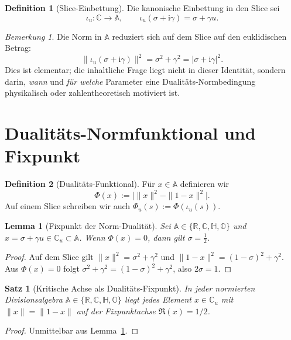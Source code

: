 \documentclass[11pt,a4paper]{article}
\theoremstyle{plain}
\newtheorem{satz}{Satz}
\newtheorem{lemma}{Lemma}
\theoremstyle{definition}
\newtheorem{definition}{Definition}
\theoremstyle{remark}
\newtheorem{bemerkung}{Bemerkung}
\newcommand{\C}{\mathbb{C}}
\newcommand{\R}{\mathbb{R}}
\newcommand{\Hh}{\mathbb{H}}
\newcommand{\Okt}{\mathbb{O}}
\newcommand{\ii}{\mathrm{i}}
\begin{document}
\begin{definition}[Slice-Einbettung]
Die kanonische Einbettung in den Slice sei
\[
\iota_u:\C\to\mathbb{A},\qquad \iota_u(\sigma+\ii\gamma)=\sigma+\gamma u.
\]
\end{definition}

\begin{bemerkung}
Die Norm in $\mathbb{A}$ reduziert sich auf dem Slice auf den euklidischen Betrag:
\[
\|\iota_u(\sigma+\ii\gamma)\|^2 = \sigma^2+\gamma^2 = |\sigma+\ii\gamma|^2.
\]
Dies ist elementar; die inhaltliche Frage liegt nicht in dieser Identit\"at, sondern darin,
\emph{wann} und \emph{f\"ur welche} Parameter eine Dualit\"ats-Normbedingung physikalisch oder
zahlentheoretisch motiviert ist.
\end{bemerkung}

\section{Dualit\"ats-Normfunktional und Fixpunkt}

\begin{definition}[Dualit\"ats-Funktional]
F\"ur $x\in\mathbb{A}$ definieren wir
\[
\Phi(x) := \big|\|x\|^2-\|1-x\|^2\big|.
\]
Auf einem Slice schreiben wir auch $\Phi_u(s):=\Phi(\iota_u(s))$.
\end{definition}

\begin{lemma}[Fixpunkt der Norm-Dualit\"at]\label{lem:fixpoint}
Sei $\mathbb{A}\in\{\R,\C,\Hh,\Okt\}$ und $x=\sigma+\gamma u\in\C_u\subset\mathbb{A}$.
Wenn $\Phi(x)=0$, dann gilt $\sigma=\tfrac12$.
\end{lemma}

\begin{proof}
Auf dem Slice gilt $\|x\|^2=\sigma^2+\gamma^2$ und $\|1-x\|^2=(1-\sigma)^2+\gamma^2$.
Aus $\Phi(x)=0$ folgt $\sigma^2+\gamma^2=(1-\sigma)^2+\gamma^2$, also $2\sigma=1$.
\end{proof}

\begin{satz}[Kritische Achse als Dualit\"ats-Fixpunkt]\label{thm:critical_axis}
In jeder normierten Divisionsalgebra $\mathbb{A}\in\{\R,\C,\Hh,\Okt\}$ liegt jedes Element
$x\in\C_u$ mit $\|x\|=\|1-x\|$ auf der Fixpunktachse $\Re(x)=1/2$.
\end{satz}

\begin{proof}
Unmittelbar aus Lemma~\ref{lem:fixpoint}.
\end{proof}
\end{document}
